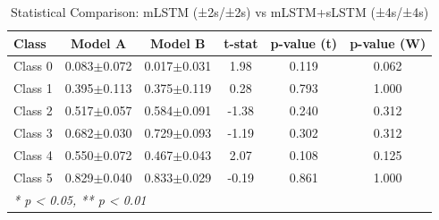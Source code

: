 \begin{table}[htbp]
\centering
\caption{Statistical Comparison: mLSTM (±2s/±2s) vs mLSTM+sLSTM (±4s/±4s)}
\label{tab:comparison_class_mlstm_±2s_±2s_vs_mlstmslstm_±4s_±4s}
\begin{tabular}{lccccc}
\toprule
\textbf{Class} & \textbf{Model A} & \textbf{Model B} & \textbf{t-stat} & \textbf{p-value (t)} & \textbf{p-value (W)} \\
\midrule
Class 0 & 0.083$\pm$0.072 & 0.017$\pm$0.031 & 1.98 & 0.119 & 0.062 \\
Class 1 & 0.395$\pm$0.113 & 0.375$\pm$0.119 & 0.28 & 0.793 & 1.000 \\
Class 2 & 0.517$\pm$0.057 & 0.584$\pm$0.091 & -1.38 & 0.240 & 0.312 \\
Class 3 & 0.682$\pm$0.030 & 0.729$\pm$0.093 & -1.19 & 0.302 & 0.312 \\
Class 4 & 0.550$\pm$0.072 & 0.467$\pm$0.043 & 2.07 & 0.108 & 0.125 \\
Class 5 & 0.829$\pm$0.040 & 0.833$\pm$0.029 & -0.19 & 0.861 & 1.000 \\
\bottomrule
\multicolumn{6}{l}{\textit{* p < 0.05, ** p < 0.01}} \\
\end{tabular}
\end{table}